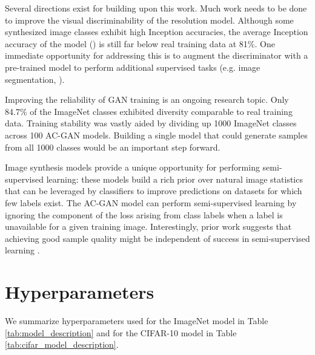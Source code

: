 \documentclass{article}
\begin{document}
Several directions exist for building upon this work.
Much work needs to be done to improve the visual discriminability
of the  resolution model.
Although some synthesized image classes exhibit high Inception accuracies, 
the average Inception accuracy of the model
() is still far below real training data at 81\%.
One immediate opportunity for addressing this is to
augment the discriminator with a pre-trained
model to perform additional supervised tasks (e.g. image segmentation, \cite{UNET}).

Improving the reliability of GAN training is an ongoing research topic.
Only 84.7\% of the ImageNet classes exhibited diversity
comparable to real training data.
Training stability was vastly aided by dividing up 1000 ImageNet classes across
100 AC-GAN models. Building a single 
model that could generate samples from all 1000 classes would be 
an important step forward.

Image synthesis models provide a unique opportunity for performing semi-supervised
learning: these models build a rich prior over natural image statistics
that can be leveraged by classifiers to improve predictions on datasets for which
few labels exist.
The AC-GAN model can perform semi-supervised learning
by ignoring the component of the loss arising from class labels when a label is
unavailable for a given training image.
Interestingly, prior work suggests that achieving good sample quality
might be independent of success in semi-supervised learning
\citep{IMPROVEDTECHNIQUES}.

\newpage

\newpage





\newpage

\appendix
\onecolumn
\section{Hyperparameters}

We summarize hyperparameters used for the ImageNet model in Table \ref{tab:model_description} and
for the CIFAR-10 model in Table \ref{tab:cifar_model_description}.
\end{document}

